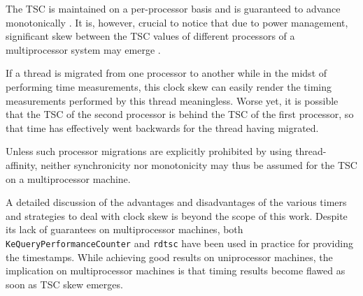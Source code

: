 The TSC is maintained on a per-processor basis and is guaranteed to advance 
monotonically \cite{intel07_2B}. It is, however, crucial to notice that due to
power management, significant skew between the TSC values of different 
processors of a multiprocessor system may emerge \cite{Brunner05}.

If a thread is migrated from one processor to another while in the midst of
performing time measurements, this clock skew can easily render the timing measurements 
performed by this thread meaningless. Worse yet, it is possible that the TSC of 
the second processor is behind the TSC of the first processor, so that time has 
effectively went backwards for the thread having migrated. 

Unless such processor migrations are explicitly prohibited by using thread-affinity,
neither synchronicity nor monotonicity may thus be assumed for the TSC on 
a multiprocessor machine.

A detailed discussion of the advantages and disadvantages of the various timers 
and strategies to deal with clock skew is beyond the scope of this work. 
Despite its lack of guarantees on multiprocessor machines, both 
\verb|KeQueryPerformanceCounter| and \verb|rdtsc| have been used in practice
for providing the timestamps. While achieving good results on
uniprocessor machines, the implication on multiprocessor machines is that
timing results become flawed as soon as TSC skew emerges.

%
%
%
%



